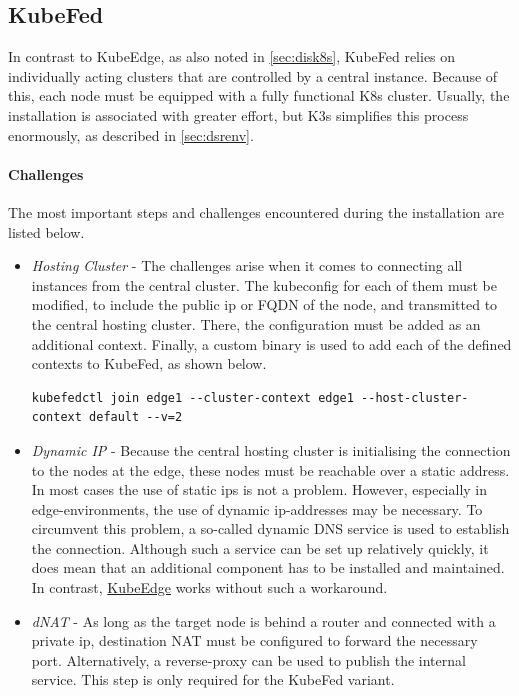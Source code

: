 \documentclass[MIC,Master,english]{twbook}%
\begin{document}
\subsection{KubeFed}
\label{sec:dsrenvkf}
In contrast to KubeEdge, as also noted in \autoref{sec:disk8s}, KubeFed relies on individually acting clusters that are controlled by a central instance. Because of this, each node must be equipped with a fully functional \ac{K8s} cluster. Usually, the installation is associated with greater effort, but K3s simplifies this process enormously, as described in \autoref{sec:dsrenv}. 

\paragraph{Challenges} The most important steps and challenges encountered during the installation are listed below.

\begin{itemize}
    \item \textit{Hosting Cluster} - The challenges arise when it comes to connecting all instances from the central cluster. The kubeconfig for each of them must be modified, to include the public ip or \ac{FQDN} of the node, and transmitted to the central hosting cluster. There, the configuration must be added as an additional context. Finally, a custom binary is used to add each of the defined contexts to \ac{KubeFed}, as shown below.

    \begin{lstlisting}[caption={KubeFed join context},captionpos=b]
    kubefedctl join edge1 --cluster-context edge1 --host-cluster-context default --v=2
    \end{lstlisting}

    \item \textit{Dynamic IP} - Because the central hosting cluster is initialising the connection to the nodes at the edge, these nodes must be reachable over a static address. In most cases the use of static ips is not a problem. However, especially in edge-environments, the use of dynamic ip-addresses may be necessary. To circumvent this problem, a so-called dynamic \ac{DNS} service is used to establish the connection. Although such a service can be set up relatively quickly, it does mean that an additional component has to be installed and maintained. In contrast, \hyperref[sec:dsrenvke]{KubeEdge} works without such a workaround.
    
    \item \textit{dNAT} - As long as the target node is behind a router and connected with a private ip, destination \ac{NAT} must be configured to forward the necessary port. Alternatively, a reverse-proxy can be used to publish the internal service. This step is only required for the KubeFed variant. 
\end{itemize}
\end{document}
